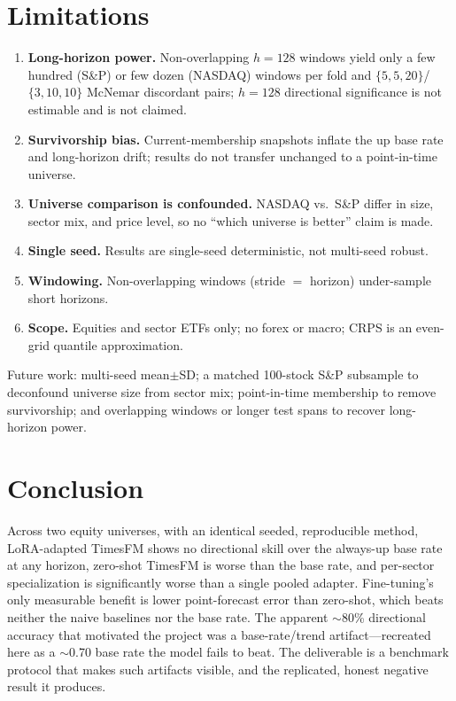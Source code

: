 \documentclass[11pt]{article}
\begin{document}
\section{Limitations}
\label{sec:limits}
\begin{enumerate}
  \item \textbf{Long-horizon power.} Non-overlapping $h=128$ windows yield only a few
  hundred (S\&P) or few dozen (NASDAQ) windows per fold and $\{5,5,20\}$/$\{3,10,10\}$
  McNemar discordant pairs; $h=128$ directional significance is not estimable and is not
  claimed.
  \item \textbf{Survivorship bias.} Current-membership snapshots inflate the up base
  rate and long-horizon drift; results do not transfer unchanged to a point-in-time
  universe.
  \item \textbf{Universe comparison is confounded.} NASDAQ vs.\ S\&P differ in size,
  sector mix, and price level, so no ``which universe is better'' claim is made.
  \item \textbf{Single seed.} Results are single-seed deterministic, not multi-seed
  robust.
  \item \textbf{Windowing.} Non-overlapping windows (stride $=$ horizon) under-sample
  short horizons.
  \item \textbf{Scope.} Equities and sector ETFs only; no forex or macro; CRPS is an
  even-grid quantile approximation.
\end{enumerate}
Future work: multi-seed mean$\pm$SD; a matched 100-stock S\&P subsample to deconfound
universe size from sector mix; point-in-time membership to remove survivorship; and
overlapping windows or longer test spans to recover long-horizon power.

\section{Conclusion}

Across two equity universes, with an identical seeded, reproducible method,
LoRA-adapted TimesFM shows no directional skill over the always-up base rate at any
horizon, zero-shot TimesFM is worse than the base rate, and per-sector specialization
is significantly worse than a single pooled adapter. Fine-tuning's only measurable
benefit is lower point-forecast error than zero-shot, which beats neither the naive
baselines nor the base rate. The apparent $\sim$80\% directional accuracy that
motivated the project was a base-rate/trend artifact---recreated here as a $\sim$0.70
base rate the model fails to beat. The deliverable is a benchmark protocol that makes
such artifacts visible, and the replicated, honest negative result it produces.
\end{document}
